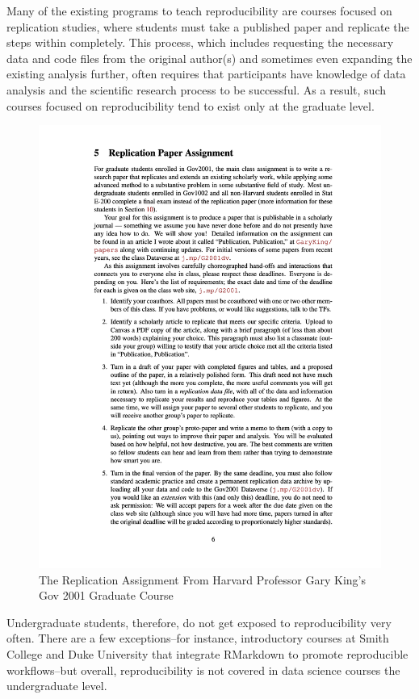 \documentclass[12pt,twoside]{reedthesis}
\begin{document}
Many of the existing programs to teach reproducibility are courses focused on replication studies, where students must take a published paper and replicate the steps within completely. This process, which includes requesting the necessary data and code files from the original author(s) and sometimes even expanding the existing analysis further, often requires that participants have knowledge of data analysis and the scientific research process to be successful. As a result, such courses focused on reproducibility tend to exist only at the graduate level.
\begin{figure}
\includegraphics[width=1\linewidth]{figure/gov-2001-replication} \caption{The Replication Assignment From Harvard Professor Gary King's Gov 2001 Graduate Course}\label{fig:unnamed-chunk-60}
\end{figure}
Undergraduate students, therefore, do not get exposed to reproducibility very often. There are a few exceptions--for instance, introductory courses at Smith College and Duke University that integrate RMarkdown to promote reproducible workflows--but overall, reproducibility is not covered in data science courses the undergraduate level.
\end{document}
